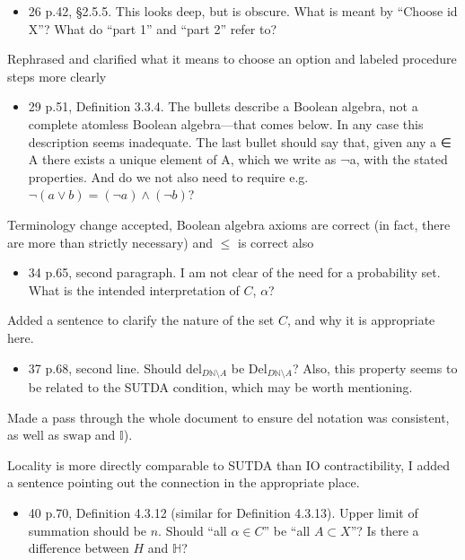 \documentclass[12pt, a4paper]{article}
\begin{document}
\begin{itemize}
    \item 26 p.42, §2.5.5. This looks deep, but is obscure. What is meant by ``Choose id X''? What do ``part 1'' and ``part 2'' refer to?
\end{itemize}

Rephrased and clarified what it means to choose an option and labeled procedure steps more clearly

\begin{itemize}
    \item 29 p.51, Definition 3.3.4. The bullets describe a Boolean algebra, not a complete atomless Boolean algebra—that comes below. In any case this description seems inadequate. The last bullet should say that, given any a ∈ A there exists a unique element of A, which we write as ¬a, with the stated properties. And do we not also need to require e.g. $\lnot (a \lor b) = (\lnot a) \land (\lnot b)$?
\end{itemize}

Terminology change accepted, Boolean algebra axioms are correct (in fact, there are more than strictly necessary) and $\leq$ is correct also

\begin{itemize}
    \item 34 p.65, second paragraph. I am not clear of the need for a probability set. What is the intended interpretation of $C$, $\alpha$?
\end{itemize}

Added a sentence to clarify the nature of the set $C$, and why it is appropriate here.

\begin{itemize}
    \item 37 p.68, second line. Should $\mathrm{del}_{D \mathbb{N}\setminus A}$ be $\mathrm{Del}_{D \mathbb{N}\setminus A}$? Also, this property seems to be related to the SUTDA condition, which may be worth mentioning.
\end{itemize}

Made a pass through the whole document to ensure $\mathrm{del}$ notation was consistent, as well as $\mathrm{swap}$ and $\mathbb{I}$). 

Locality is more directly comparable to SUTDA than IO contractibility, I added a sentence pointing out the connection in the appropriate place.

\begin{itemize}
    \item  40 p.70, Definition 4.3.12 (similar for Definition 4.3.13). Upper limit of summation should be $n$. Should ``all $\alpha\in C$'' be ``all $A \subset X$''? Is there a difference between $H$ and $\mathbb{H}$?
\end{itemize}
\end{document}
